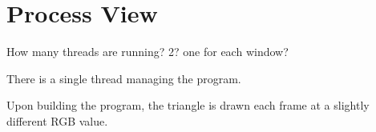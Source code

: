 \section{Process View}
\label{section:procView}

How many threads are running? 2? one for each window?

There is a single thread managing the program.


Upon building the program, the triangle is drawn each frame at a slightly different RGB value.

